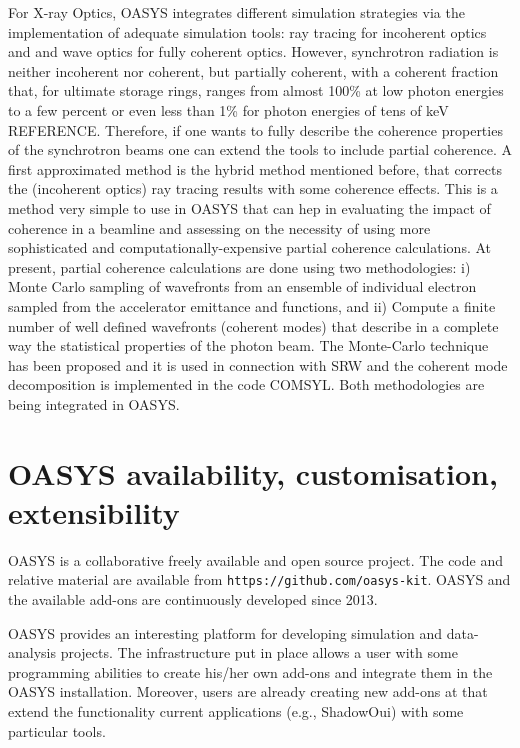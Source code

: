 \documentclass{aip-cp}
\begin{document}
For X-ray Optics, OASYS integrates different simulation strategies via the implementation of adequate simulation tools: ray tracing for incoherent optics and and wave optics for fully coherent optics. However, synchrotron radiation is neither incoherent nor coherent, but partially coherent, with a coherent fraction that, for ultimate storage rings, ranges from almost 100\% at low photon energies to a few percent or even less than 1\% for photon energies of tens of keV REFERENCE. Therefore, if one wants to fully describe the coherence properties of the synchrotron beams one can extend the tools to include partial coherence. A first approximated method is the hybrid method mentioned before, that corrects the (incoherent optics) ray tracing results with some coherence effects. This is a method very simple to use in OASYS that can hep in evaluating the impact of coherence in a beamline and assessing on the necessity of using more sophisticated and computationally-expensive partial coherence calculations.  At present, partial coherence calculations are done using two methodologies: i) Monte Carlo sampling of wavefronts from an ensemble of individual electron sampled from the accelerator emittance and functions, and ii) Compute a finite number of well defined wavefronts (coherent modes) that describe in a complete way the statistical properties of the photon beam. The Monte-Carlo technique has been proposed and it is used in connection with SRW \cite{multielectron} and the coherent mode decomposition is implemented in the code COMSYL. Both methodologies are being integrated in OASYS.  


\section{OASYS availability, customisation, extensibility}

OASYS is a collaborative freely available and open source project. The code and relative material are available from {\tt https://github.com/oasys-kit}.    OASYS and the available add-ons are continuously developed since 2013.

OASYS provides an interesting platform for developing simulation and data-analysis projects. The infrastructure put in place allows a user with some programming abilities to create his/her own add-ons and integrate them in the OASYS installation. Moreover, users are already creating new add-ons at that extend the functionality current applications (e.g., ShadowOui) with some particular tools. 
\end{document}
